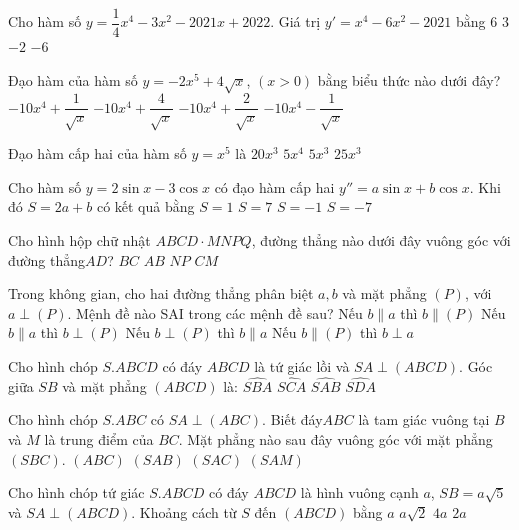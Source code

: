 \begin{ex}
Cho hàm số $y=\dfrac{1}{4}x^4-3x^2-2021x+2022$. Giá trị $y'=x^4-6x^2-2021$ bằng
\choice
{\True $6$}
{$3$}
{$-2$}
{$-6$}
\end{ex}
\begin{ex}
Đạo hàm của hàm số $y=-2x^5+4\sqrt{x}$, $(x>0)$ bằng biểu thức nào dưới đây?
\choice
{$-10x^4+\dfrac{1}{\sqrt{x}}$}
{$-10x^4+\dfrac{4}{\sqrt{x}}$}
{\True $-10x^4+\dfrac{2}{\sqrt{x}}$}
{$-10x^4-\dfrac{1}{\sqrt{x}}$}
\end{ex}
\begin{ex}
Đạo hàm cấp hai của hàm số $y=x^5$ là
\choice
{\True $20x^3$}
{$5x^4$}
{$5x^3$}
{$25x^3$}
\end{ex}
\begin{ex}
Cho hàm số $y=2\sin x-3\cos x$ có đạo hàm cấp hai $y''=a\sin x+b\cos x$. Khi đó $S=2a+b$ có kết quả bằng
\choice
{$S=1$}
{$S=7$}
{\True $S=-1$}
{$S=-7$}
\end{ex}
\begin{ex}
Cho hình hộp chữ nhật $ABCD \cdot MNPQ$, đường thẳng nào dưới đây vuông góc với đường thẳng$AD$?
\choice
{$BC$}
{\True $AB$}
{$NP$}
{$CM$}
\end{ex}
\begin{ex}
Trong không gian, cho hai đường thẳng phân biệt $a,b$ và mặt phẳng $(P)$, với $a\perp (P)$. Mệnh đề nào SAI trong các mệnh đề sau?
\choice
{\True Nếu $b \parallel a$ thì $b \parallel (P)$}
{Nếu $b \parallel a$ thì $b\perp (P)$}
{Nếu $b\perp (P)$ thì $b \parallel a$}
{Nếu $b \parallel (P)$ thì $b \perp a$}
\end{ex}
\begin{ex}
Cho hình chóp $S.ABCD$ có đáy $ABCD$ là tứ giác lồi và $SA\perp (ABCD)$. Góc giữa $SB$ và mặt phẳng $(ABCD)$ là:
\choice
{\True $\widehat{SBA}$}
{$\widehat{SCA}$}
{$\widehat{SAB}$}
{$\widehat{SDA}$}
\end{ex}
\begin{ex}
Cho hình chóp $S.ABC$ có $SA\perp (ABC)$. Biết đáy$ABC$ là tam giác vuông tại $B$ và $M$ là trung điểm của $BC$. Mặt phẳng nào sau đây vuông góc với mặt phẳng $(SBC)$.
\choice
{$(ABC)$}
{\True $(SAB)$}
{$(SAC)$}
{$(SAM)$}
\end{ex}
\begin{ex}
Cho hình chóp tứ giác $S.ABCD$ có đáy $ABCD$ là hình vuông cạnh $a$, $SB=a\sqrt{5}$ và $SA\perp (ABCD)$. Khoảng cách từ $S$ đến $(ABCD)$ bằng
\choice
{$a$}
{$a\sqrt{2}$}
{$4a$}
{\True $2a$}
\end{ex}
